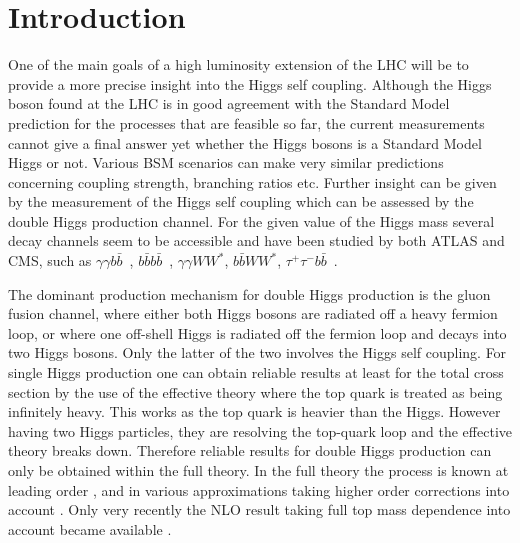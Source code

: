 \section{Introduction}
\label{sec:intro}

One of the main goals of a high luminosity extension of the LHC will be to provide a more precise insight into the Higgs self 
coupling. Although the Higgs boson found at the LHC \cite{Aad:2012tfa,Chatrchyan:2012xdj} is in good agreement with the
Standard Model prediction for the processes that are feasible so far, the current measurements cannot give a final answer
yet whether the Higgs bosons is a Standard Model Higgs or not. Various BSM scenarios can make very similar predictions
concerning coupling strength, branching ratios etc. Further insight can be given by the measurement of the Higgs self coupling
which can be assessed by the double Higgs production channel. For the given value of the Higgs mass several decay channels
seem to be accessible and have been studied by both ATLAS and CMS, such as $\gamma\gamma
b\bar{b}$~\cite{TheATLAScollaboration:2016ibb,Khachatryan:2016sey,Aad:2015xja,Aad:2014yja},
$b\bar{b}b\bar{b}$~\cite{Aaboud:2016xco,CMS:2016tlj,Aad:2015xja,Khachatryan:2015yea,Aad:2015uka},
$\gamma\gamma W W^*$, $b\bar{b}W W^*$,
$\tau^+\tau^-b\bar{b}$~\cite{ATLAS:2016qmt,CMS:2016cdj,CMS:2016ymn,CMS:2016rec,CMS:2016guv,CMS:2016ugf,CMS:2016zxv,Aad:2015xja}.

The dominant production mechanism for double Higgs production is the gluon fusion channel, where either both Higgs bosons
are radiated off a heavy fermion loop, or where one off-shell Higgs is radiated off the fermion loop and decays into two Higgs
bosons. Only the latter of the two involves the Higgs self coupling.  For single Higgs production one can obtain reliable results
at least for the total cross section by the use of the effective theory where the top quark is treated as being infinitely heavy.
This works as the top quark is heavier than the Higgs. However having two Higgs particles, they are resolving the top-quark
loop and the effective theory breaks down. Therefore reliable results for double Higgs production can only be obtained  within
the full theory. In the full theory the process is known at leading order \cite{Eboli:1987dy,Glover:1987nx,Plehn:1996wb}, and in various approximations
taking higher order corrections into account \cite{Dawson:1998py,Maltoni:2014eza,Grigo:2013rya,Grigo:2014jma,Grigo:2015dia,Degrassi:2016vss,
deFlorian:2013uza,deFlorian:2013jea,Shao:2013bz,deFlorian:2015moa,deFlorian:2016uhr}. Only very recently the NLO result taking full top
mass dependence into account became available \cite{Borowka:2016ehy,Borowka:2016ypz}.

